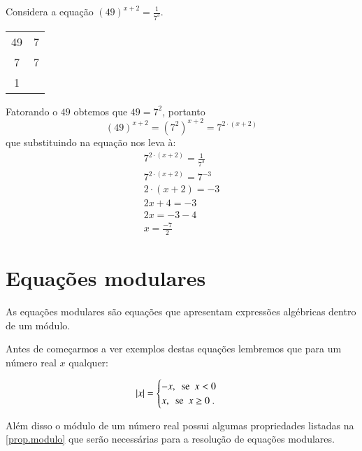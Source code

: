  \begin{exem}
  Considera a equação $(49)^{x+2}= \frac{1}{7^3}$.

  \begin{tabular}{c|c}
   49 & 7 \\
   7  & 7 \\
   1  &   \\
  \end{tabular}

  Fatorando o $49$ obtemos que $49= 7^2$, portanto
  \[(49)^{x+2}= (7^2)^{x+2}= 7^{2\cdot (x+2)}\]
  que substituindo na equação nos leva à:
  \begin{eqnarray*}
   7^{2\cdot (x+2)}= \frac{1}{7^3} \\
   7^{2\cdot (x+2)}= 7^{-3} \\
   2\cdot (x+2) = -3 \\
   2x + 4 = -3 \\
   2x= -3 -4 \\
   x= \frac{-7}{2}
  \end{eqnarray*}
 \end{exem}

 \section{Equações modulares}

   \vskip0.3cm
 \colorbox{azul}{
 \begin{minipage}{0.9\linewidth}
 \begin{center}
  As equações modulares são equações que apresentam expressões algébricas dentro de um módulo.
 \end{center}
 \end{minipage}}
 \vskip0.3cm

 Antes de começarmos a ver exemplos destas equações lembremos que para um número real $x$ qualquer:

 \[
\left|x\right|= \begin{cases}
      -x, \ \ \text{se} \ \ x<0 \\
      x, \ \ \text{se} \ \ x \geq 0 \ .
     \end{cases}
\]

Além disso o módulo de um número real possui algumas propriedades listadas na \autoref{prop.modulo} que serão necessárias para a resolução de equações modulares.

